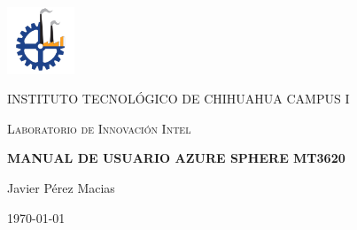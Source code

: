 \documentclass[]{article}
\begin{document}
	\begin{titlepage}
		\centering
		\includegraphics[width=0.15\textwidth]{ITCH}\par\vspace{1cm}
		{\textsc{INSTITUTO TECNOLÓGICO DE CHIHUAHUA CAMPUS I} \par}
		\vspace{0.5cm}
		{\textsc{Laboratorio de Innovación Intel} \par}
		\vspace{1cm}
		\vspace{1.5cm}
		{\huge\bfseries MANUAL DE USUARIO AZURE SPHERE MT3620 \par}
		\vspace{2cm}
		{\Large Javier Pérez Macias\par}
		\vfill
		{\large \today\par}
	\end{titlepage}
	\pagebreak
	\tableofcontents
	
	
	
	
	
	
	
	
\end{document}
